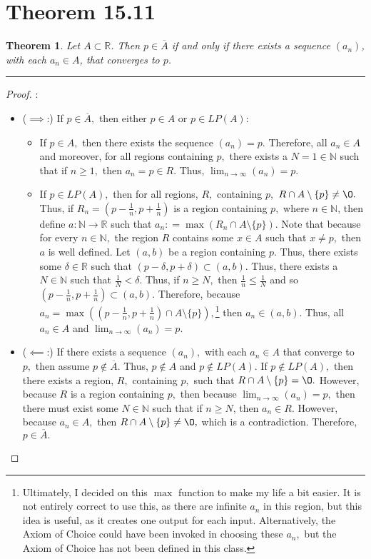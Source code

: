 \documentclass[openany, amssymb, psamsfonts]{amsart}
\newcommand{\bbN}{\mathbb{N}}
\newcommand{\bbR}{\mathbb{R}}
\renewcommand{\emptyset}{\O}
\newtheorem{thm}{Theorem}[section]
\theoremstyle{definition}
\numberwithin{equation}{section}
\begin{document}
\section*{Theorem 15.11}
\begin{thm}
	\label{15.11}
	Let $A \subset \bbR$. Then $p \in \overline{A}$ if and only if there exists a sequence $(a_n)$, with each $a_n \in A$, that converges to $p$.
\end{thm}
\vspace{4pt}     \hrule   \vspace{4pt} \begin{proof}:\\
\begin{itemize}
\item ($\implies$:) If $p \in \overline{A},$ then either $p\in A$ or $p\in LP(A):$
\begin{itemize}
\item If $p\in A,$ then there exists the sequence $(a_n) = p.$ Therefore, all $a_n \in A$ and moreover, for all regions containing $p,$ there exists a $N = 1\in \bbN$ such that if $n\geq 1,$ then $a_n = p \in R.$ Thus, $\lim_{n\to \infty}(a_n) = p.$
\item If $p\in LP(A),$ then for all regions, $R,$ containing $p,$ $R\cap A\setminus\{p\}\neq \emptyset.$ Thus, if $R_n = (p-\frac{1}{n}, p+\frac{1}{n})$ is a region containing $p,$ where $n\in \bbN$, then define $a: \bbN \to \bbR$ such that $a_n: = \max(R_n \cap A \setminus\{p\}).$ Note that because for every $n\in \bbN,$ the region $R$ contains some $x\in A$ such that $x\neq p,$ then $a$ is well defined. Let $(a,b)$ be a region containing $p.$ Thus, there exists some $\delta\in \bbR$ such that $(p-\delta, p+ \delta) \subset (a,b).$ Thus, there exists a $N \in \bbN$ such that $\frac{1}{N} < \delta.$ Thus, if $n\geq N,$ then $\frac{1}{n}\leq \frac{1}{N}$ and so $(p-\frac{1}{n}, p+\frac{1}{n})\subset (a,b).$ Therefore, because $a_n = \max((p-\frac{1}{n}, p+\frac{1}{n}) \cap A\setminus\{p\}),$\footnote{Ultimately, I decided on this $\max$ function to make my life a bit easier. It is not entirely correct to use this, as there are infinite $a_n$ in this region, but this idea is useful, as it creates one output for each input. Alternatively, the Axiom of Choice could have been invoked in choosing these $a_n,$ but the Axiom of Choice has not been defined in this class.} then $a_n \in (a,b).$ Thus, all $a_n \in A$ and $\lim_{n\to \infty}(a_n) = p.$
\end{itemize}
\item ($\impliedby$:) If there exists a sequence $(a_n),$ with each $a_n \in A$ that converge to $p,$ then assume $p\notin \overline{A}.$ Thus,  $p\notin A$ and $p\notin LP(A).$ If $p\notin LP(A),$ then there exists a region, $R,$ containing $p,$ such that $R \cap A\setminus\{p\} = \emptyset.$ However, because $R$ is a region containing $p,$ then because $\lim_{n\to \infty}(a_n) = p,$ then there must exist some $N \in \bbN$ such that if $n\geq N$, then $a_n \in R.$ However, because $a_n \in A,$ then $R \cap A\setminus\{p\} \neq \emptyset,$ which is a contradiction. Therefore, $p\in \overline{A}.$

\end{itemize}
\end{proof}
\end{document}
